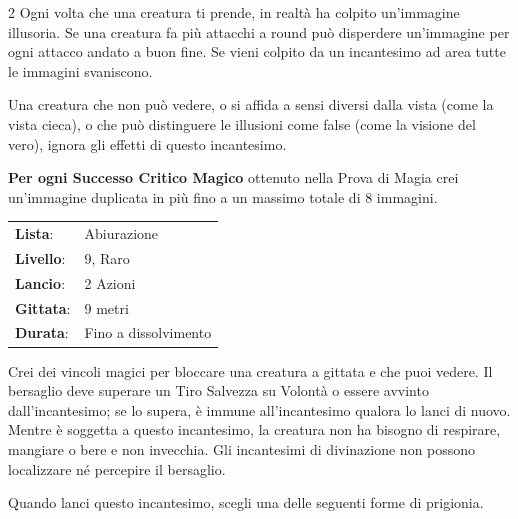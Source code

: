 \begin{multicols}{2}
Ogni volta che una creatura ti prende, in realtà ha colpito un'immagine illusoria.
Se una creatura fa più attacchi a round può disperdere un'immagine per ogni attacco andato a buon fine. Se vieni colpito da un incantesimo ad area tutte le immagini svaniscono.

Una creatura che non può vedere, o si affida a sensi diversi dalla vista (come la vista cieca), o che può distinguere le illusioni come false (come la visione del vero), ignora gli effetti di questo incantesimo.

\textbf{Per ogni Successo Critico Magico} ottenuto nella Prova di Magia crei un'immagine duplicata in più fino a un massimo totale di 8 immagini.

\noindent\begin{tabularx}{\linewidth}{p{1.9cm}X}
	\rowcolor{gray!20}\textbf{Lista}: & Abiurazione \\
	\textbf{Livello}: & 9, Raro \\
	\rowcolor{gray!20}\textbf{Lancio}: & 2 Azioni \\
	\textbf{Gittata}: & 9 metri \\
	\rowcolor{gray!20}\textbf{Durata}: & Fino a dissolvimento \\
\end{tabularx}\smallskip

Crei dei vincoli magici per bloccare una creatura a gittata e che puoi vedere. Il bersaglio deve superare un Tiro Salvezza su Volontà o essere avvinto dall'incantesimo; se lo supera, è immune all'incantesimo qualora lo lanci di nuovo. Mentre è soggetta a questo incantesimo, la creatura non ha bisogno di respirare, mangiare o bere e non invecchia. Gli incantesimi di divinazione non possono localizzare né percepire il bersaglio.

Quando lanci questo incantesimo, scegli una delle seguenti forme di prigionia.


\end{multicols}
